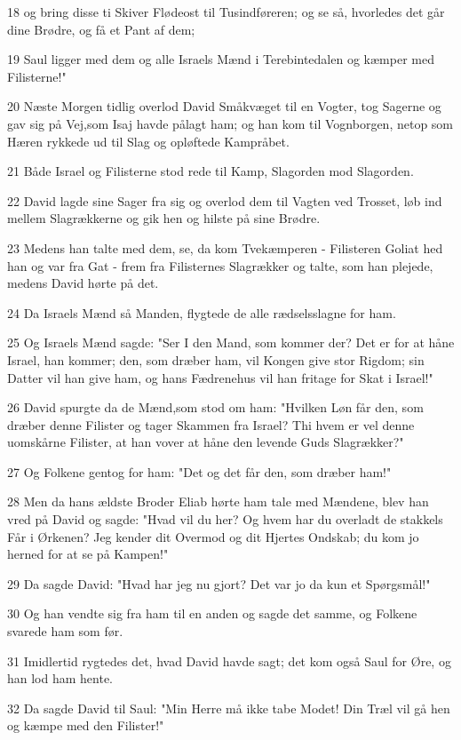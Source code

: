 \par 18 og bring disse ti Skiver Flødeost til Tusindføreren; og se så, hvorledes det går dine Brødre, og få et Pant af dem;
\par 19 Saul ligger med dem og alle Israels Mænd i Terebintedalen og kæmper med Filisterne!"
\par 20 Næste Morgen tidlig overlod David Småkvæget til en Vogter, tog Sagerne og gav sig på Vej,som Isaj havde pålagt ham; og han kom til Vognborgen, netop som Hæren rykkede ud til Slag og opløftede Kampråbet.
\par 21 Både Israel og Filisterne stod rede til Kamp, Slagorden mod Slagorden.
\par 22 David lagde sine Sager fra sig og overlod dem til Vagten ved Trosset, løb ind mellem Slagrækkerne og gik hen og hilste på sine Brødre.
\par 23 Medens han talte med dem, se, da kom Tvekæmperen - Filisteren Goliat hed han og var fra Gat - frem fra Filisternes Slagrækker og talte, som han plejede, medens David hørte på det.
\par 24 Da Israels Mænd så Manden, flygtede de alle rædselsslagne for ham.
\par 25 Og Israels Mænd sagde: "Ser I den Mand, som kommer der? Det er for at håne Israel, han kommer; den, som dræber ham, vil Kongen give stor Rigdom; sin Datter vil han give ham, og hans Fædrenehus vil han fritage for Skat i Israel!"
\par 26 David spurgte da de Mænd,som stod om ham: "Hvilken Løn får den, som dræber denne Filister og tager Skammen fra Israel? Thi hvem er vel denne uomskårne Filister, at han vover at håne den levende Guds Slagrækker?"
\par 27 Og Folkene gentog for ham: "Det og det får den, som dræber ham!"
\par 28 Men da hans ældste Broder Eliab hørte ham tale med Mændene, blev han vred på David og sagde: "Hvad vil du her? Og hvem har du overladt de stakkels Får i Ørkenen? Jeg kender dit Overmod og dit Hjertes Ondskab; du kom jo herned for at se på Kampen!"
\par 29 Da sagde David: "Hvad har jeg nu gjort? Det var jo da kun et Spørgsmål!"
\par 30 Og han vendte sig fra ham til en anden og sagde det samme, og Folkene svarede ham som før.
\par 31 Imidlertid rygtedes det, hvad David havde sagt; det kom også Saul for Øre, og han lod ham hente.
\par 32 Da sagde David til Saul: "Min Herre må ikke tabe Modet! Din Træl vil gå hen og kæmpe med den Filister!"
